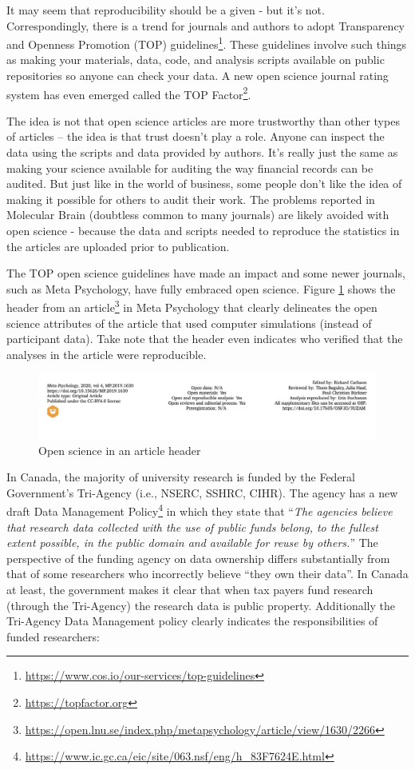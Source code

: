 \documentclass[
]{krantz}
\renewcommand{\href}[2]{#2\footnote{\url{#1}}}
\begin{document}
It may seem that reproducibility should be a given - but it's not. Correspondingly, there is a trend for journals and authors to adopt Transparency and Openness Promotion (TOP) \href{https://www.cos.io/our-services/top-guidelines}{guidelines}. These guidelines involve such things as making your materials, data, code, and analysis scripts available on public repositories so anyone can check your data. A new open science journal rating system has even emerged called the \href{https://topfactor.org}{TOP Factor}.

The idea is not that open science articles are more trustworthy than other types of articles -- the idea is that trust doesn't play a role. Anyone can inspect the data using the scripts and data provided by authors. It's really just the same as making your science available for auditing the way financial records can be audited. But just like in the world of business, some people don't like the idea of making it possible for others to audit their work. The problems reported in Molecular Brain (doubtless common to many journals) are likely avoided with open science - because the data and scripts needed to reproduce the statistics in the articles are uploaded prior to publication.

The TOP open science guidelines have made an impact and some newer journals, such as Meta Psychology, have fully embraced open science. Figure \ref{fig:metapsychology} shows the header from an \href{https://open.lnu.se/index.php/metapsychology/article/view/1630/2266}{article} in Meta Psychology that clearly delineates the open science attributes of the article that used computer simulations (instead of participant data). Take note that the header even indicates who verified that the analyses in the article were reproducible.

\begin{figure}
\includegraphics[width=1\linewidth]{ch_enter_load/images/screenshot_metapsychology} \caption{Open science in an article header}\label{fig:metapsychology}
\end{figure}

In Canada, the majority of university research is funded by the Federal Government's Tri-Agency (i.e., NSERC, SSHRC, CIHR). The agency has a new draft \href{https://www.ic.gc.ca/eic/site/063.nsf/eng/h_83F7624E.html}{Data Management Policy} in which they state that ``\emph{The agencies believe that research data collected with the use of public funds belong, to the fullest extent possible, in the public domain and available for reuse by others.}'' The perspective of the funding agency on data ownership differs substantially from that of some researchers who incorrectly believe ``they own their data''. In Canada at least, the government makes it clear that when tax payers fund research (through the Tri-Agency) the research data is public property. Additionally the Tri-Agency Data Management policy clearly indicates the responsibilities of funded researchers:
\end{document}
